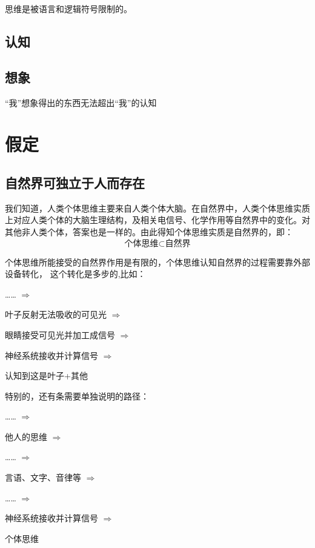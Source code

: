 \documentclass[fontset=windows, 12pt, a4paper]{article}
\begin{document}
思维是被语言和逻辑符号限制的。

\subsection{认知}


\subsection{想象}
“我”想象得出的东西无法超出“我”的认知

\section{假定}
\subsection{自然界可独立于人而存在}

我们知道，人类个体思维主要来自人类个体大脑。在自然界中，人类个体思维实质上对应人类个体的大脑生理结构，及相关电信号、化学作用等自然界中的变化。对其他非人类个体，答案也是一样的。由此得知个体思维实质是自然界的，即：
$$\pmb{\mbox{个体思维} \subset \mbox{自然界}}$$

个体思维所能接受的自然界作用是有限的，个体思维认知自然界的过程需要靠外部设备转化，
这个转化是多步的,比如：\par
\begin{center}
    ……
    $\Rightarrow$\par
    叶子反射无法吸收的可见光
    $\Rightarrow$\par
    眼睛接受可见光并加工成信号
    $\Rightarrow$\par
    神经系统接收并计算信号
    $\Rightarrow$\par
    认知到这是叶子+其他
\end{center}
特别的，还有条需要单独说明的路径：\par
\begin{center}
    ……
    $\Rightarrow$\par
    他人的思维
    $\Rightarrow$\par
    ……
    $\Rightarrow$\par
    言语、文字、音律等
    $\Rightarrow$\par
    ……
    $\Rightarrow$\par
    神经系统接收并计算信号
    $\Rightarrow$\par
    个体思维
\end{center}
\end{document}
